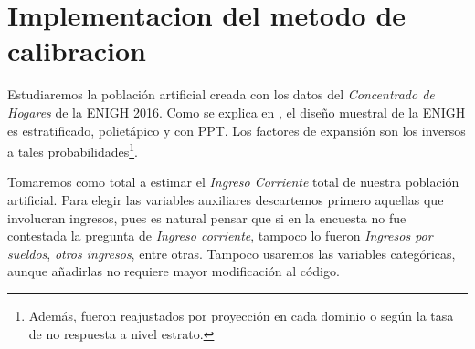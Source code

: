 \documentclass[a4paper,twoside,openright,12pt]{book}
\theoremstyle{definition}
\numberwithin{equation}{chapter}
\numberwithin{figure}{chapter}
\numberwithin{table}{chapter}
\numberwithin{theorem}{chapter}
\numberwithin{lemma}{chapter}
\begin{document}
\section{Implementacion del metodo de calibracion}\label{chp:13}
Estudiaremos la población artificial creada con los datos del \textsl{Concentrado de Hogares} de la ENIGH 2016. Como se explica en \cite{inegi2}, el diseño muestral de la ENIGH es estratificado, polietápico y con PPT. Los factores de expansión son los inversos a tales probabilidades\footnote{Además, fueron reajustados por proyección en cada dominio o según la tasa de no respuesta a nivel estrato.}.

Tomaremos como total a estimar el \textsl{Ingreso Corriente} total de nuestra población artificial.  Para elegir las variables auxiliares descartemos primero aquellas que involucran ingresos, pues es natural pensar que si en la encuesta no fue contestada la pregunta de \textsl{Ingreso corriente}, tampoco lo fueron \textsl{Ingresos por sueldos}, \textsl{otros ingresos}, entre otras. Tampoco usaremos las variables categóricas, aunque añadirlas no requiere mayor modificación al código.
\end{document}
